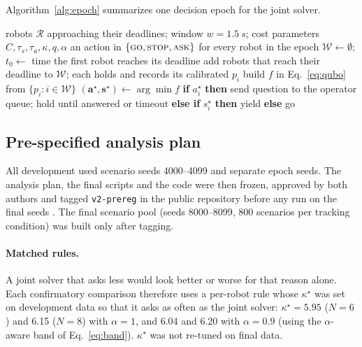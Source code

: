 \documentclass[a4paper,fleqn]{cas-dc}
\newcommand{\pgo}{\textsc{go}}
\newcommand{\pstop}{\textsc{stop}}
\newcommand{\pask}{\textsc{ask}}
\begin{document}
Algorithm~\ref{alg:epoch} summarizes one decision epoch for the joint solver.

\begin{algorithm}
\caption{One decision epoch with the joint solver}
\label{alg:epoch}
\begin{algorithmic}[1]
\Require robots $\mathcal{R}$ approaching their deadlines; window $w = \SI{1.5}{s}$; cost parameters $C,\tau_s,\tau_a,\kappa,q,\alpha$
\Ensure an action in $\{\pgo,\pstop,\pask\}$ for every robot in the epoch
\State $\mathcal{W} \gets \emptyset$; $t_0 \gets$ time the first robot reaches its deadline
  \State add robots that reach their deadline to $\mathcal{W}$; each holds and records its calibrated $p_i$
\EndWhile
\State build $f$ in Eq.~\eqref{eq:qubo} from $\{p_i : i \in \mathcal{W}\}$
\State $(\mathbf{a}^\star,\mathbf{s}^\star) \gets \arg\min f$ 
  \State \textbf{if} $a_i^\star$ \textbf{then} send question to the operator queue; hold until answered or timeout
  \State \textbf{else if} $s_i^\star$ \textbf{then} yield \textbf{else} go
\EndFor
\end{algorithmic}
\end{algorithm}

\subsection{Pre-specified analysis plan}
\label{sec:plan}

All development used scenario seeds 4000--4099 and separate epoch seeds. The analysis plan, the final scripts and the code were then frozen, approved by both authors and tagged \texttt{v2-prereg} in the public repository before any run on the final seeds \citep{nosek2018prereg}. The final scenario pool (seeds 8000--8099, 800 scenarios per tracking condition) was built only after tagging.

\paragraph{Matched rules.} A joint solver that asks less would look better or worse for that reason alone. Each confirmatory comparison therefore uses a per-robot rule whose $\kappa^\star$ was set on development data so that it asks as often as the joint solver: $\kappa^\star = 5.95$ ($N = 6$) and 6.15 ($N = 8$) with $\alpha = 1$, and 6.04 and 6.20 with $\alpha = 0.9$ (using the $\alpha$-aware band of Eq.~\eqref{eq:band}). $\kappa^\star$ was not re-tuned on final data.
\end{document}
